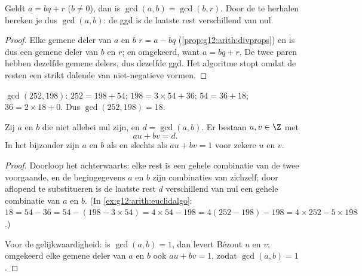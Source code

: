 \begin{proposition}\label{prop:g12:arith:euclidalgo}
Geldt $a = bq + r$ ($b \neq 0$), dan is $\gcd(a, b) = \gcd(b, r)$. Door de
 te herhalen bereken je dus $\gcd(a,b)$: de ggd is de
laatste rest verschillend van nul.
\end{proposition}

\begin{proof}
Elke gemene deler van $a$ en $b$  $r = a - bq$
(\cref{prop:g12:arith:divprops}) en is dus een gemene deler van $b$ en $r$;
en omgekeerd, want $a = bq + r$. De twee paren hebben dezelfde gemene delers,
dus dezelfde ggd. Het algoritme stopt omdat de resten een strikt dalende 
van niet-negatieve  vormen.
\end{proof}

\begin{example}\label{ex:g12:arith:euclidalgo}
$\gcd(252, 198)$: $252 = 198 + 54$; $198 = 3\times54 + 36$;
$54 = 36 + 18$; $36 = 2 \times 18 + 0$. Dus $\gcd(252,198) = 18$.
\end{example}

\begin{theorem}\label{thm:g12:arith:bezout}
Zij $a$ en $b$  die niet allebei nul zijn, en $d = \gcd(a,b)$.
Er bestaan $u, v \in \Z$ met
\[
au + bv = d .
\]
In het bijzonder zijn $a$ en $b$  als en slechts als
$au + bv = 1$ voor zekere  $u$ en $v$.
\end{theorem}

\begin{proof}
Doorloop het  achterwaarts: elke rest is een gehele
combinatie van de twee voorgaande, en de begingegevens $a$ en $b$ zijn
combinaties van zichzelf; door aflopend te substitueren is de laatste rest $d$
verschillend van nul een gehele combinatie van $a$ en $b$. (In
\cref{ex:g12:arith:euclidalgo}:
$18 = 54 - 36 = 54 - (198 - 3\times54) = 4\times54 - 198 =
4(252 - 198) - 198 = 4\times252 - 5\times198$.)

Voor de gelijkwaardigheid: is $\gcd(a,b) = 1$, dan levert Bézout $u$ en $v$;
omgekeerd  elke gemene deler van $a$ en $b$ ook $au + bv = 1$, zodat
$\gcd(a,b) = 1$.
\end{proof}

